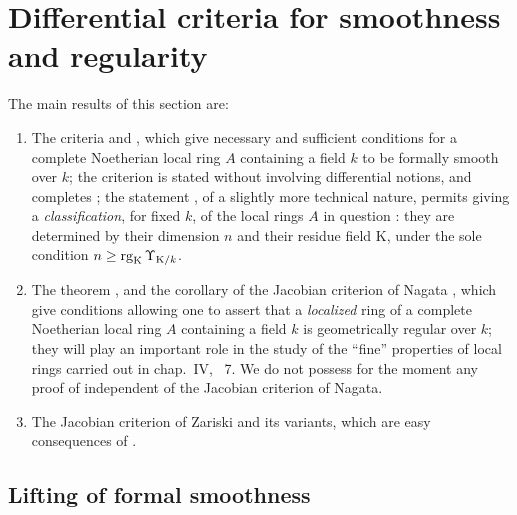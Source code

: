 \section{Differential criteria for smoothness and regularity}
\label{section:0.22}

The main results of this section are:
\begin{enumerate}
  \item[\textit{a)}] The criteria  and , which give necessary and sufficient conditions for a complete Noetherian local ring $A$ containing a field $k$ to be formally smooth over $k$; the criterion  is stated without involving differential notions, and completes ; the statement , of a slightly more technical nature, permits giving a \emph{classification}, for fixed $k$, of the local rings $A$ in question : they are determined by their dimension $n$ and their residue field $\mathrm{K}$, under the sole condition $n\geq\operatorname{rg}_\mathrm{K}\Upsilon_{\mathrm{K}/k}$.
  \item[\textit{b)}] The theorem , and the corollary  of the Jacobian criterion of Nagata , which give conditions allowing one to assert that a \emph{localized} ring of a complete Noetherian local ring $A$ containing a field $k$ is geometrically regular over $k$; they will play an important role in the study of the ``fine'' properties of local rings carried out in chap.~IV, \textsection~7. We do not possess for the moment any proof of  independent of the Jacobian criterion of Nagata.
  \item[\textit{c)}] The Jacobian criterion of Zariski  and its variants, which are easy consequences of .
\end{enumerate}

\subsection{Lifting of formal smoothness}
\label{subsection:0.22.1}

